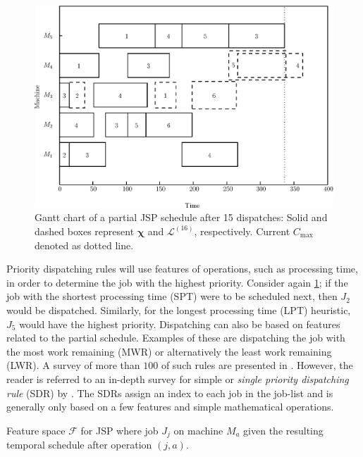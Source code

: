\documentclass[twocolumn]{svjour3}
\newcommand{\vchi}{\bm \chi}
\newcommand{\dr}{dispatching rule}
\newcommand{\sdr}{single priority \dr}
\begin{document}
\begin{figure}[t!]\centering
\includegraphics[width=\columnwidth]{jssp_example}
\caption[Gantt chart of a partial JSP schedule]{Gantt chart of a
partial JSP schedule after 15 dispatches: Solid and dashed boxes
represent $\vchi$ and $\mathcal{L}^{(16)}$, respectively. Current
$C_{\max}$ denoted as dotted line.}
\label{fig:jssp:example}
\end{figure}


Priority \dr s will use features of operations, such as processing time, 
in order to determine the job with the highest priority. 
Consider again \cref{fig:jssp:example}; if the job with the shortest processing 
time (SPT) were to be scheduled next, then $J_2$ would be dispatched. 
Similarly, for the longest processing time (LPT) heuristic, $J_5$ would have 
the highest priority. 
Dispatching can also be based on features related to the partial schedule. 
Examples of these are dispatching the job with the most work remaining (MWR) or 
alternatively the least work remaining (LWR). A survey of more than $100$ of 
such rules are presented in \cite{Panwalkar77}. 
However, the reader is referred to an in-depth survey for simple or 
\emph{\sdr} (SDR) by \cite{Haupt89}. 
The SDRs assign an index to each job in the job-list and is generally only 
based on a few features and simple mathematical operations.

\begin{table}[t!] \centering
\caption[Feature space $\mathcal{F}$ for JSP]{Feature space 
$\mathcal{F}$ for JSP where job $J_j$ on machine $M_a$ given the 
resulting temporal schedule after operation $(j,a)$.
}
\label{tbl:jssp:feat}
{\setlength{\tabcolsep}{3pt} }
\end{table}
\end{document}
